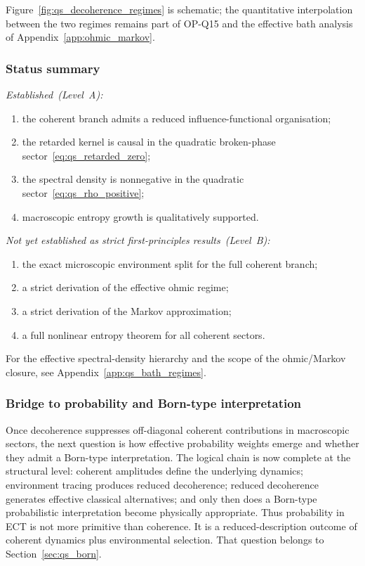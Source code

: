 Figure~\ref{fig:qs_decoherence_regimes} is schematic; the quantitative
interpolation between the two regimes remains part of OP-Q15 and the
effective bath analysis of Appendix~\ref{app:ohmic_markov}.

\subsubsection*{Status summary}

\textit{Established~(Level~A):}
\begin{enumerate}[label=(\roman*)]
  \item the coherent branch admits a reduced influence-functional
    organisation;
  \item the retarded kernel is causal in the quadratic broken-phase
    sector~\eqref{eq:qs_retarded_zero};
  \item the spectral density is nonnegative in the quadratic
    sector~\eqref{eq:qs_rho_positive};
  \item macroscopic entropy growth is qualitatively supported.
\end{enumerate}

\textit{Not yet established as strict first-principles results~(Level~B):}
\begin{enumerate}[label=(\roman*)]
  \item the exact microscopic environment split for the full coherent
    branch;
  \item a strict derivation of the effective ohmic regime;
  \item a strict derivation of the Markov approximation;
  \item a full nonlinear entropy theorem for all coherent sectors.
\end{enumerate}

For the effective spectral-density hierarchy and the scope of the
ohmic/Markov closure, see Appendix~\ref{app:qs_bath_regimes}.

\subsubsection*{Bridge to probability and Born-type interpretation}

Once decoherence suppresses off-diagonal coherent contributions in
macroscopic sectors, the next question is how effective probability
weights emerge and whether they admit a Born-type interpretation.
The logical chain is now complete at the structural level:
coherent amplitudes define the underlying dynamics;
environment tracing produces reduced decoherence;
reduced decoherence generates effective classical alternatives;
and only then does a Born-type probabilistic interpretation become
physically appropriate.
Thus probability in ECT is not more primitive than coherence.
It is a reduced-description outcome of coherent dynamics plus
environmental selection.
That question belongs to Section~\ref{sec:qs_born}.

